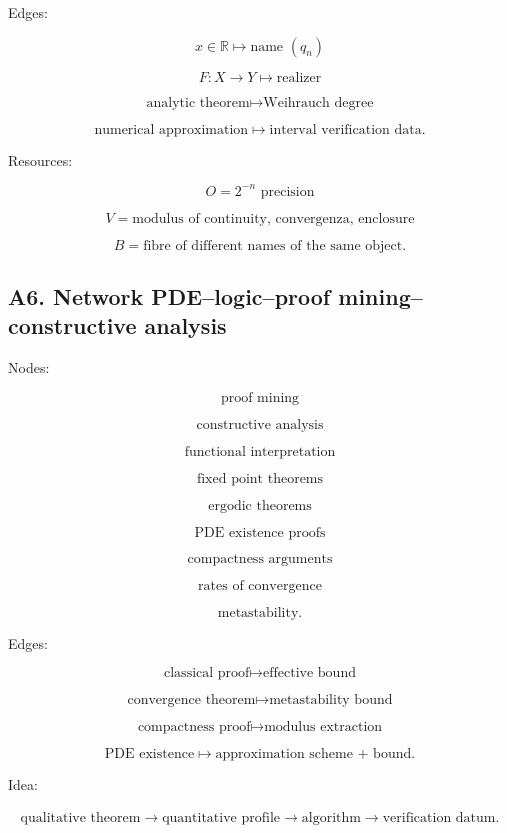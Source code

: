 \documentclass[11pt]{article}
\begin{document}
Edges:

\[
x\in\mathbb R\mapsto \text{name }(q_n)
\]

\[
F:X\to Y\mapsto \text{realizer}
\]

\[
\text{analytic theorem}\mapsto \text{Weihrauch degree}
\]

\[
\text{numerical approximation}\mapsto \text{interval verification data}.
\]

Resources:

\[
O=2^{-n}\text{ precision}
\]

\[
V=\text{modulus of continuity, convergenza, enclosure}
\]

\[
B=\text{fibre of different names of the same object}.
\]



\subsection{A6. Network PDE--logic--proof mining--constructive analysis}

Nodes:

\[
\text{proof mining}
\]

\[
\text{constructive analysis}
\]

\[
\text{functional interpretation}
\]

\[
\text{fixed point theorems}
\]

\[
\text{ergodic theorems}
\]

\[
\text{PDE existence proofs}
\]

\[
\text{compactness arguments}
\]

\[
\text{rates of convergence}
\]

\[
\text{metastability}.
\]

Edges:

\[
\text{classical proof}\mapsto \text{effective bound}
\]

\[
\text{convergence theorem}\mapsto \text{metastability bound}
\]

\[
\text{compactness proof}\mapsto \text{modulus extraction}
\]

\[
\text{PDE existence}\mapsto \text{approximation scheme + bound}.
\]

Idea:

\[
\begin{gathered}
\text{qualitative theorem} \to \text{quantitative profile} \to \text{algorithm} \to \text{verification datum}.
\end{gathered}
\]
\end{document}
